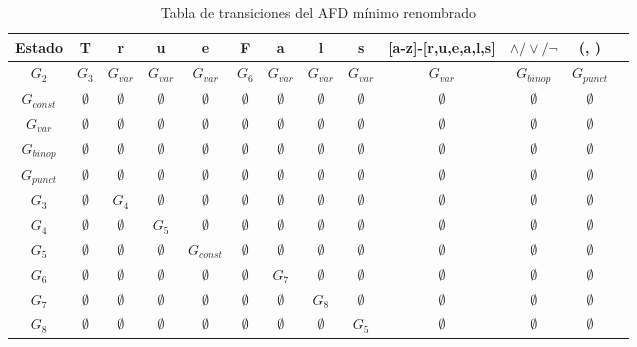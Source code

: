 \begin{table}[h!]
    \centering
    \begin{tabular}{|c|c|c|c|c|c|c|c|c|c|c|c|c|}
    \hline
    Estado &T & r & u & e & F & a & l &s &[a-z]-[r,u,e,a,l,s] &$\land/\lor/\lnot$ & (, )\\ \hline
    \hline
    $G_2$ & $ G_3$ & $ G_{var}$ & $G_{var}$ & $G_{var}$ & $G_6$ & $G_{var}$ & $G_{var}$ & $G_{var}$ & $G_{var}$ & $G_{binop}$ & $G_{punct}$\\ \hline
    $G_{const}$ & $\emptyset$ & $\emptyset$ & $\emptyset$ & $\emptyset$ & $\emptyset$ & $\emptyset$ & $\emptyset$ & $\emptyset $ & $\emptyset$ & $\emptyset$ & $\emptyset$\\ \hline
    $G_{var}$ & $\emptyset$ & $\emptyset$ & $\emptyset$ & $\emptyset$ & $\emptyset$ & $\emptyset$ & $\emptyset$ & $\emptyset $ & $\emptyset$ & $\emptyset$ & $\emptyset$\\ \hline
    $G_{binop}$ & $\emptyset$ & $\emptyset$ & $\emptyset$ & $\emptyset$ & $\emptyset$ & $\emptyset$ & $\emptyset$ & $\emptyset $ & $\emptyset$ & $\emptyset$ & $\emptyset$\\ \hline
    $G_{punct}$ & $\emptyset$ & $\emptyset$ & $\emptyset$ & $\emptyset$ & $\emptyset$ & $\emptyset$ & $\emptyset$ & $\emptyset $ & $\emptyset$ & $\emptyset$ & $\emptyset$\\ \hline
    $G_3$ & $\emptyset$ &  $G_4$& $\emptyset$ & $\emptyset$ & $\emptyset$  & $\emptyset$ & $\emptyset$ & $\emptyset$ & $\emptyset$ & $\emptyset$ & $\emptyset$\\ \hline
    $G_4$ & $\emptyset$ &  $\emptyset$&  $G_5$& $\emptyset$ & $\emptyset$  & $\emptyset$ & $\emptyset$ & $\emptyset$ & $\emptyset$ & $\emptyset$ & $\emptyset$\\ \hline
    $G_5$ & $\emptyset$ &  $\emptyset$& $\emptyset$ &  $G_{const}$& $\emptyset$  & $\emptyset$ & $\emptyset$ & $\emptyset$ & $\emptyset$ & $\emptyset$ & $\emptyset$\\ \hline
    $G_6$ & $\emptyset$ & $\emptyset$ & $\emptyset$ & $\emptyset$  & $\emptyset$  & $G_7$ & $\emptyset$ & $\emptyset$& $\emptyset$ & $\emptyset$ & $\emptyset$\\ \hline
    $G_7$ & $\emptyset$ &  $\emptyset$& $\emptyset$ & $\emptyset$ & $\emptyset$  & $\emptyset$ & $G_8$ & $\emptyset$ & $\emptyset$ & $\emptyset$ & $\emptyset$\\ \hline
    $G_8$ & $\emptyset$ &  $\emptyset$& $\emptyset$ & $\emptyset$ & $\emptyset$  & $\emptyset$ & $\emptyset$ & $G_5$ & $\emptyset$ & $\emptyset$ & $\emptyset$\\ \hline
    \end{tabular}
    \caption{Tabla de transiciones del AFD mínimo renombrado}
\end{table}


